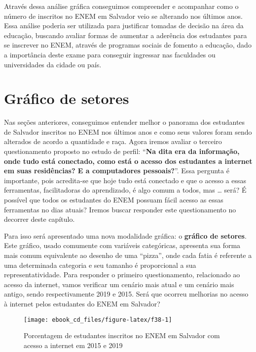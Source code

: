 \documentclass[
  oneside]{book}
\begin{document}
Através dessa análise gráfica conseguimos compreender e acompanhar como o número de inscritos no ENEM em Salvador veio se alterando nos últimos anos. Essa análise poderia ser utilizada para justificar tomadas de decisão na área da educação, buscando avaliar formas de aumentar a aderência dos estudantes para se inscrever no ENEM, através de programas sociais de fomento a educação, dado a importância deste exame para conseguir ingressar nas faculdades ou universidades da cidade ou país.

\hypertarget{gset}{%
\section{Gráfico de setores}\label{gset}}

Nas seções anteriores, conseguimos entender melhor o panorama dos estudantes de Salvador inscritos no ENEM nos últimos anos e como seus valores foram sendo alterados de acordo a quantidade e raça. Agora iremos avaliar o terceiro questionamento proposto no estudo de perfil: ``\textbf{Na dita era da informação, onde tudo está conectado, como está o acesso dos estudantes a internet em suas residências? E a computadores pessoais?}''. Essa pergunta é importante, pois acredita-se que hoje tudo está conectado e que o acesso a essas ferramentas, facilitadoras do aprendizado, é algo comum a todos, mas \ldots{} será? É possível que todos os estudantes do ENEM possuam fácil acesso as essas ferramentas no dias atuais? Iremos buscar responder este questionamento no decorrer deste capítulo.

Para isso será apresentado uma nova modalidade gráfica: o \textbf{gráfico de setores}. Este gráfico, usado comumente com variáveis categóricas, apresenta sua forma mais comum equivalente ao desenho de uma ``pizza'', onde cada fatia é referente a uma determinada categoria e seu tamanho é proporcional a sua representatividade. Para responder o primeiro questionamento, relacionado ao acesso da internet, vamos verificar um cenário mais atual e um cenário mais antigo, sendo respectivamente 2019 e 2015. Será que ocorreu melhorias no acesso à internet pelos estudantes do ENEM em Salvador?

\begin{figure}

{\centering \texttt{[image: ebook\_cd\_files/figure-latex/f38-1]} 

}

\caption{Porcentagem de estudantes inscritos no ENEM em Salvador com acesso a internet em 2015 e 2019}\label{fig:f38}
\end{figure}
\end{document}

